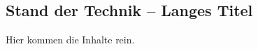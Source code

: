 \begin{showRelatedWork}%
%
\chapter[Stand der Technik -- Kurztitel für Inhaltsverzeichnis und Kolumnentitel]{Stand der Technik -- Langes Titel}%
\label{chap:StandDerTechnik}
%
Hier kommen die Inhalte rein.
%
%
%
%
\end{showRelatedWork}%